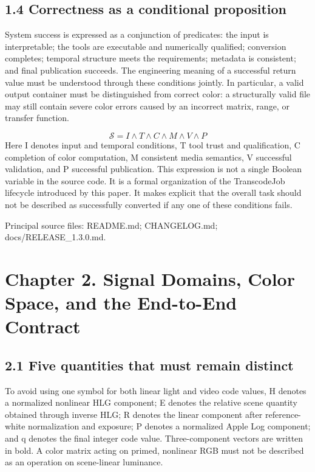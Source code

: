 \documentclass[11pt,a4paper,openany]{book}
\begin{document}
\section*{1.4 Correctness as a conditional proposition}
System success is expressed as a conjunction of predicates: the input is interpretable; the tools are executable and numerically qualified; conversion completes; temporal structure meets the requirements; metadata is consistent; and final publication succeeds. The engineering meaning of a successful return value must be understood through these conditions jointly. In particular, a valid output container must be distinguished from correct color: a structurally valid file may still contain severe color errors caused by an incorrect matrix, range, or transfer function.


\begin{equation}
\mathcal{S}=I\land T\land C\land M\land V\land P
\end{equation}
Here I denotes input and temporal conditions, T tool trust and qualification, C completion of color computation, M consistent media semantics, V successful validation, and P successful publication. This expression is not a single Boolean variable in the source code. It is a formal organization of the TranscodeJob lifecycle introduced by this paper. It makes explicit that the overall task should not be described as successfully converted if any one of these conditions fails.


\par\small Principal source files: README.md; CHANGELOG.md; docs/RELEASE\_1.3.0.md.\normalsize

\chapter*{Chapter 2. Signal Domains, Color Space, and the End-to-End Contract}

\section*{2.1 Five quantities that must remain distinct}
To avoid using one symbol for both linear light and video code values, H denotes a normalized nonlinear HLG component; E denotes the relative scene quantity obtained through inverse HLG; R denotes the linear component after reference-white normalization and exposure; P denotes a normalized Apple Log component; and q denotes the final integer code value. Three-component vectors are written in bold. A color matrix acting on primed, nonlinear RGB must not be described as an operation on scene-linear luminance.
\end{document}
